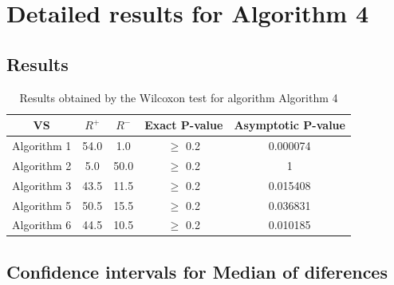 \documentclass[a4paper,10pt]{article}
\begin{document}
 \clearpage 


\section{Detailed results for Algorithm 4}


\subsection{Results}

\begin{table}[!htp]
\centering\small
\begin{tabular}{
|c|c|c|c|c|}
\hline
 VS & $R^{+}$ & $R^{-}$ & Exact P-value & Asymptotic P-value \\ \hline 
Algorithm 1 & 54.0 & 1.0 & $\geq$ 0.2 & 0.000074\\ \hline 
Algorithm 2 & 5.0 & 50.0 & $\geq$ 0.2 & 1\\ \hline 
Algorithm 3 & 43.5 & 11.5 & $\geq$ 0.2 & 0.015408\\ \hline 
Algorithm 5 & 50.5 & 15.5 & $\geq$ 0.2 & 0.036831\\ \hline 
Algorithm 6 & 44.5 & 10.5 & $\geq$ 0.2 & 0.010185\\ \hline 

\end{tabular}
\caption{Results obtained by the Wilcoxon test for algorithm Algorithm 4}
\end{table}

\subsection{Confidence intervals for Median of diferences}
\end{document}
